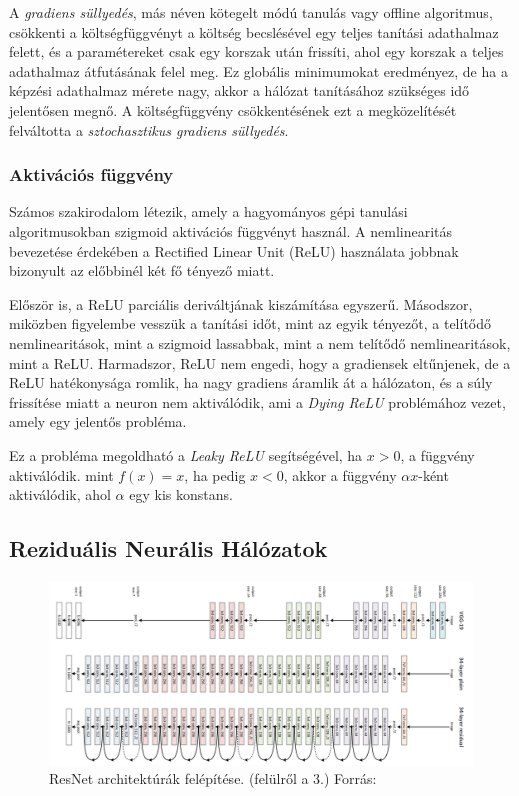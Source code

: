 \documentclass[12pt,a4]{article}
\begin{document}
	A \textit{gradiens süllyedés}, más néven kötegelt módú tanulás vagy offline algoritmus, csökkenti a költségfüggvényt a költség becslésével egy teljes tanítási adathalmaz felett, és a paramétereket csak egy korszak után frissíti, ahol egy korszak a teljes adathalmaz átfutásának felel meg.
	Ez globális minimumokat eredményez, de ha a képzési adathalmaz mérete nagy, akkor a hálózat tanításához szükséges idő
	jelentősen megnő. A költségfüggvény csökkentésének ezt a megközelítését felváltotta a \textit{sztochasztikus gradiens süllyedés}.
 
	\subsubsection{Aktivációs függvény}
	
	Számos szakirodalom létezik, amely a hagyományos gépi tanulási algoritmusokban
	szigmoid aktivációs függvényt használ.
	A nemlinearitás bevezetése érdekében a Rectified Linear Unit (ReLU) használata jobbnak bizonyult az előbbinél
	két fő tényező miatt. 
	
	Először is, a ReLU parciális deriváltjának kiszámítása egyszerű. 
	Másodszor, miközben figyelembe vesszük
	a tanítási időt, mint az egyik tényezőt, a telítődő nemlinearitások, mint a szigmoid lassabbak, mint a nem telítődő nemlinearitások, mint a ReLU.
	 Harmadszor, ReLU nem engedi, hogy a gradiensek eltűnjenek, de a ReLU hatékonysága romlik, ha nagy gradiens áramlik át a hálózaton, és a súly frissítése miatt a neuron nem aktiválódik, ami a \textit{Dying ReLU} problémához vezet, amely egy jelentős probléma. 
	 
	 Ez a probléma megoldható a \textit{Leaky ReLU} segítségével, ha $x>0$, a függvény aktiválódik.
	mint $f(x)= x$, ha pedig $x<0$, akkor a függvény $\alpha x$-ként aktiválódik, ahol $\alpha$ egy kis konstans.

    \subsection{Reziduális Neurális Hálózatok}
    
    \begin{figure}[h]	
 		\centering
 		\includegraphics[width=1\linewidth]{ResNet}
 		\caption{ResNet architektúrák felépítése. (felülről a 3.)
 			Forrás:\cite{resnet}}
        \label{fig:resnet}
 	\end{figure}
    
\end{document}
